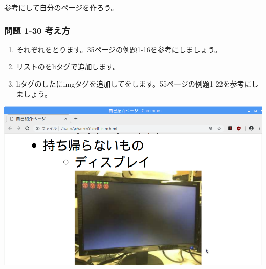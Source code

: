 \bigskip
参考にして自分のページを作ろう。

\clearpage
\subsubsection{\bfseries 問題 1-30 考え方}

\begin{enumerate}
  \item
        それぞれをとります。35ページの例題1-16を参考にしましょう。
  \item リストのをliタグで追加します。
  \item
        liタグのしたにimgタグを追加してをします。55ページの例題1-22を参考にしましょう。
\end{enumerate}
\centering
{}
\flushleft

\bigskip

\centering
\includegraphics[width=\textwidth]{text01-img/textbook-img244.png}
\flushleft

\bigskip

\clearpage

